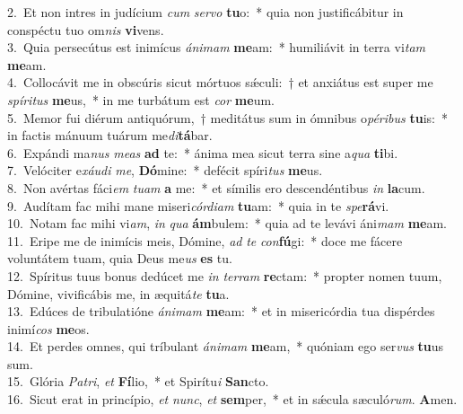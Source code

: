 {2.~}Et non intres in judícium \textit{cum} \textit{ser}\textit{vo} \textbf{tu}o:~* quia non justificábitur in conspéctu tuo om\textit{nis} \textbf{vi}vens.\\
{3.~}Quia persecútus est inimícus \textit{á}\textit{ni}\textit{mam} \textbf{me}am:~* humiliávit in terra vi\textit{tam} \textbf{me}am.\\
{4.~}Collocávit me in obscúris sicut mórtuos sǽculi:~† et anxiátus est super me \textit{spí}\textit{ri}\textit{tus} \textbf{me}us,~* in me turbátum est \textit{cor} \textbf{me}um.\\
{5.~}Memor fui diérum antiquórum,~† meditátus sum in ómnibus o\textit{pé}\textit{ri}\textit{bus} \textbf{tu}is:~* in factis mánuum tuárum me\textit{di}\textbf{tá}bar.\\
{6.~}Expándi ma\textit{nus} \textit{me}\textit{as} \textbf{ad} te:~* ánima mea sicut terra sine a\textit{qua} \textbf{ti}bi.\\
{7.~}Velóciter e\textit{xáu}\textit{di} \textit{me}, \textbf{Dó}mine:~* defécit spíri\textit{tus} \textbf{me}us.\\
{8.~}Non avértas fáci\textit{em} \textit{tu}\textit{am} \textbf{a} me:~* et símilis ero descendéntibus \textit{in} \textbf{la}cum.\\
{9.~}Audítam fac mihi mane miseri\textit{cór}\textit{di}\textit{am} \textbf{tu}am:~* quia in te \textit{spe}\textbf{rá}vi.\\
{10.~}Notam fac mihi vi\textit{am}, \textit{in} \textit{qua} \textbf{ám}bulem:~* quia ad te levávi áni\textit{mam} \textbf{me}am.\\
{11.~}Eripe me de inimícis meis, Dómine, \textit{ad} \textit{te} \textit{con}\textbf{fú}gi:~* doce me fácere voluntátem tuam, quia Deus me\textit{us} \textbf{es} tu.\\
{12.~}Spíritus tuus bonus dedúcet me \textit{in} \textit{ter}\textit{ram} \textbf{re}ctam:~* propter nomen tuum, Dómine, vivificábis me, in æquitá\textit{te} \textbf{tu}a.\\
{13.~}Edúces de tribulatióne \textit{á}\textit{ni}\textit{mam} \textbf{me}am:~* et in misericórdia tua dispérdes inimí\textit{cos} \textbf{me}os.\\
{14.~}Et perdes omnes, qui tríbulant \textit{á}\textit{ni}\textit{mam} \textbf{me}am,~* quóniam ego ser\textit{vus} \textbf{tu}us sum.\\
{15.~}Glória \textit{Pa}\textit{tri}, \textit{et} \textbf{Fí}lio,~* et Spirítu\textit{i} \textbf{San}cto.\\
{16.~}Sicut erat in princípio, \textit{et} \textit{nunc}, \textit{et} \textbf{sem}per,~* et in sǽcula sæculó\textit{rum}. \textbf{A}men.\\
